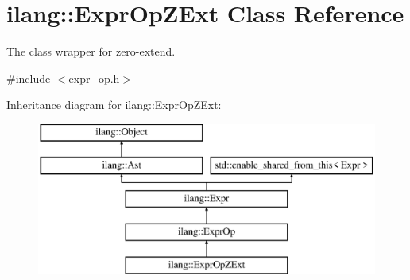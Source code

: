 \hypertarget{classilang_1_1_expr_op_z_ext}{}\section{ilang\+:\+:Expr\+Op\+Z\+Ext Class Reference}
\label{classilang_1_1_expr_op_z_ext}


The class wrapper for zero-\/extend.  




{\ttfamily \#include $<$expr\+\_\+op.\+h$>$}

Inheritance diagram for ilang\+:\+:Expr\+Op\+Z\+Ext\+:\begin{figure}[H]
\begin{center}
\leavevmode
\includegraphics[height=5.000000cm]{classilang_1_1_expr_op_z_ext}
\end{center}
\end{figure}
